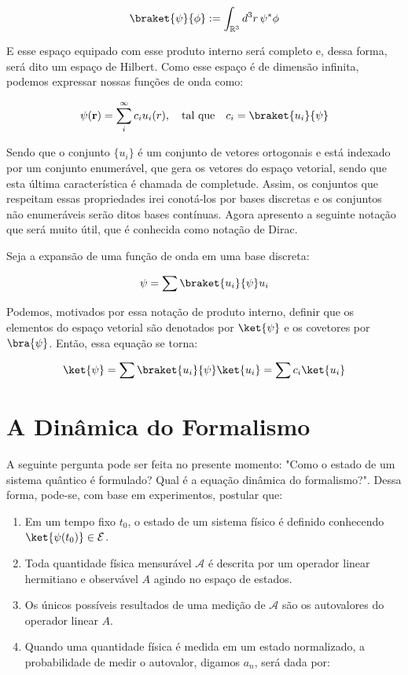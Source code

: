\documentclass{article}
\begin{document}
	\[\braket{\psi}{\phi}:= \int_{\mathbb{R}^3}d^3r \,\psi^*\phi\]
	
	E esse espaço equipado com esse produto interno será completo e, dessa forma, será dito um espaço de Hilbert. Como esse espaço é de dimensão infinita, podemos expressar nossas funções de onda como:
	
	\[\psi(\mathbf{r})=\sum_i^{\infty} c_i u_i(r), \quad \text{tal que} \quad c_i=\braket{u_i}{\psi}\]
	
	Sendo que o conjunto $\{u_i\}$ é um conjunto de vetores ortogonais e está indexado por um conjunto enumerável, que gera os vetores do espaço vetorial, sendo que esta última característica é chamada de completude. Assim, os conjuntos que respeitam essas propriedades irei conotá-los por bases discretas e os conjuntos não enumeráveis serão ditos bases contínuas. Agora apresento a seguinte notação que será muito útil, que é conhecida como notação de Dirac.
	
	Seja a expansão de uma função de onda em uma base discreta:
	
	\[\psi=\sum \braket{u_i}{\psi} u_i\]
	
	Podemos, motivados por essa notação de produto interno, definir que os elementos do espaço vetorial são denotados por $\ket{\psi}$ e os covetores por $\bra{\psi}$. Então, essa equação se torna:
	
	\[\ket{\psi}=\sum \braket{u_i}{\psi} \ket{u_i}=\sum c_i \ket{u_i}\]
	\newpage
	\section{A Dinâmica do Formalismo}
	
	A seguinte pergunta pode ser feita no presente momento: "Como o estado de um sistema quântico é formulado? Qual é a equação dinâmica do formalismo?". Dessa forma, pode-se, com base em experimentos, postular que:
	\begin{enumerate}[label=\roman*]
		\item Em um tempo fixo $t_0$, o estado de um sistema físico é definido conhecendo $\ket{\psi(t_0)} \in \mathcal{E}$.
		\item Toda quantidade física mensurável $\mathcal{A}$ é descrita por um operador linear hermitiano e observável $A$ agindo no espaço de estados.
		\item Os únicos possíveis resultados de uma medição de $\mathcal{A}$ são os autovalores do operador linear $A$.
		\item Quando uma quantidade física é medida em um estado normalizado, a probabilidade de medir o autovalor, digamos $a_n$, será dada por:
	\end{enumerate}
	
\end{document}
